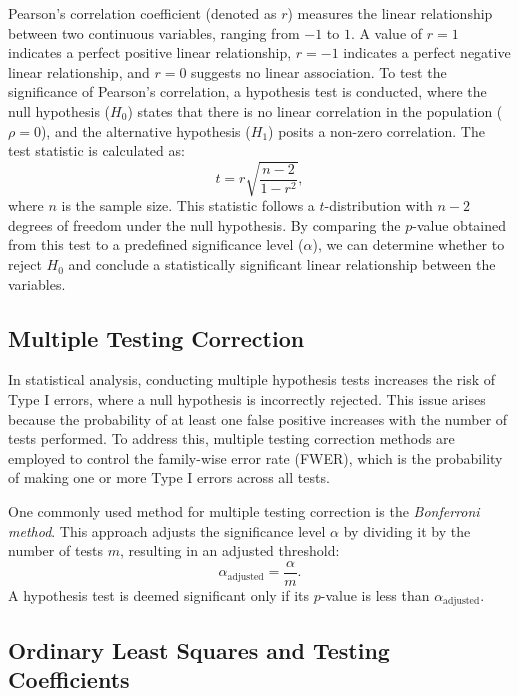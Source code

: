 \documentclass[11pt]{article}
\begin{document}
Pearson's correlation coefficient (denoted as \( r \)) measures the linear relationship between two continuous variables, ranging from \(-1\) to \(1\). A value of \( r = 1 \) indicates a perfect positive linear relationship, \( r = -1 \) indicates a perfect negative linear relationship, and \( r = 0 \) suggests no linear association. To test the significance of Pearson's correlation, a hypothesis test is conducted, where the null hypothesis (\( H_0 \)) states that there is no linear correlation in the population (\( \rho = 0 \)), and the alternative hypothesis (\( H_1 \)) posits a non-zero correlation. The test statistic is calculated as:
\[
t = r\sqrt{\frac{n-2}{1-r^2}},
\]
where \( n \) is the sample size. This statistic follows a \( t \)-distribution with \( n-2 \) degrees of freedom under the null hypothesis. By comparing the \( p \)-value obtained from this test to a predefined significance level (\( \alpha \)), we can determine whether to reject \( H_0 \) and conclude a statistically significant linear relationship between the variables.

\subsection{Multiple Testing Correction}
\label{Multiple-Testing-Correction}

In statistical analysis, conducting multiple hypothesis tests increases the risk of Type I errors, where a null hypothesis is incorrectly rejected. This issue arises because the probability of at least one false positive increases with the number of tests performed. To address this, multiple testing correction methods are employed to control the family-wise error rate (FWER), which is the probability of making one or more Type I errors across all tests.

One commonly used method for multiple testing correction is the \textit{Bonferroni method}. This approach adjusts the significance level \( \alpha \) by dividing it by the number of tests \( m \), resulting in an adjusted threshold:
\[
\alpha_{\text{adjusted}} = \frac{\alpha}{m}.
\]
A hypothesis test is deemed significant only if its \( p \)-value is less than \( \alpha_{\text{adjusted}} \). 

\subsection{Ordinary Least Squares and Testing Coefficients}
\label{OLS-and-Testing-Coefficients}
\end{document}

